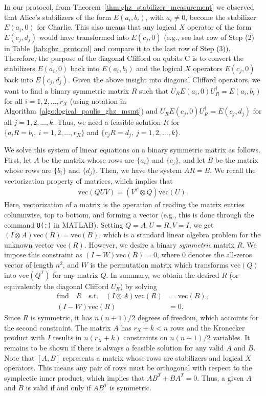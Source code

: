 \documentclass[journal,onecolumn]{IEEEtran}
\begin{document}
In our protocol, from Theorem~\ref{thm:ghz_stabilizer_measurement} we observed that Alice's stabilizers of the form $E(a_i,b_i)$, with $a_i \neq 0$, become the stabilizer $E(a_i,0)$ for Charlie.
This also means that any logical $X$ operator of the form $E(c_j,d_j)$ would have transformed into $E(c_j,0)$ (e.g., see last row of Step (2) in Table~\ref{tab:ghz_protocol} and compare it to the last row of Step (3)). 
Therefore, the purpose of the diagonal Clifford on qubits C is to convert the stabilizers $E(a_i,0)$ back into $E(a_i,b_i)$ and the logical $X$ operators $E(c_j,0)$ back into $E(c_j,d_j)$.
Given the above insight into diagonal Clifford operators, we want to find a binary symmetric matrix $R$ such that $U_R E(a_i,0) U_R^\dagger = E(a_i,b_i)$ for all $i=1,2,\ldots,r_X$ (using notation in Algorithm~\ref{algo:logical_paulis_ghz_msmt}) and $U_R E(c_j,0) U_R^\dagger = E(c_j,d_j)$ for all $j=1,2,\ldots,k$.
Thus, we need a feasible solution $R$ for $\{ a_i R = b_i,\ i=1,2,\ldots,r_X \}$ and $\{ c_j R = d_j,\ j=1,2,\ldots,k \}$.

We solve this system of linear equations on a binary symmetric matrix as follows.
First, let $A$ be the matrix whose rows are $\{ a_i \}$ and $\{ c_j \}$, and let $B$ be the matrix whose rows are $\{ b_i \}$ and $\{ d_j \}$.
Then, we have the system $A R = B$.
We recall the vectorization property of matrices, which implies that 
\begin{align}
\text{vec}(QUV) = (V^T \otimes Q) \text{vec}(U).
\end{align}
Here, vectorization of a matrix is the operation of reading the matrix entries columnwise, top to bottom, and forming a vector (e.g., this is done through the command \texttt{U(:)} in MATLAB).
Setting $Q=A, U=R, V=I$, we get $(I \otimes A) \text{vec}(R) = \text{vec}(B)$, which is a standard linear algebra problem for the unknown vector $\text{vec}(R)$.
However, we desire a binary \emph{symmetric} matrix $R$.
We impose this constraint as $(I - W) \text{vec}(R) = 0$, where $0$ denotes the all-zeros vector of length $n^2$, and $W$ is the permutation matrix which transforms $\text{vec}(Q)$ into $\text{vec}(Q^T)$ for any matrix $Q$.
In summary, we obtain the desired $R$ (or equivalently the diagonal Clifford $U_R$) by solving
\begin{align}
\text{find} \quad R \quad \text{s.t.} \quad (I \otimes A) \text{vec}(R) & = \text{vec}(B), \nonumber \\
%
  (I - W) \text{vec}(R) & = 0 .
\end{align}
Since $R$ is symmetric, it has $n(n+1)/2$ degrees of freedom, which accounts for the second constraint.
The matrix $A$ has $r_X + k < n$ rows and the Kronecker product with $I$ results in $n(r_X + k)$ constraints on $n(n+1)/2$ variables.
It remains to be shown if there is always a feasible solution for any valid $A$ and $B$.
Note that $[A,B]$ represents a matrix whose rows are stabilizers and logical $X$ operators.
This means any pair of rows must be orthogonal with respect to the symplectic inner product, which implies that $AB^T + BA^T = 0$.
Thus, a given $A$ and $B$ is valid if and only if $AB^T$ is symmetric.
\end{document}
